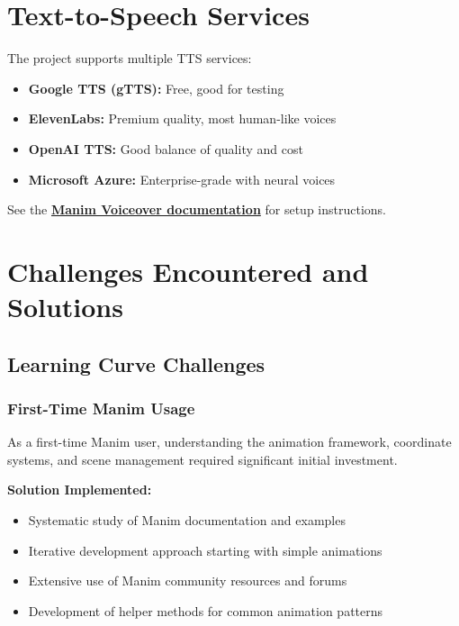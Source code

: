 \documentclass[12pt,a4paper]{article}
\begin{document}
\section{Text-to-Speech Services}

The project supports multiple TTS services:

\begin{itemize}
    \item \textbf{Google TTS (gTTS):} Free, good for testing
    \item \textbf{ElevenLabs:} Premium quality, most human-like voices
    \item \textbf{OpenAI TTS:} Good balance of quality and cost
    \item \textbf{Microsoft Azure:} Enterprise-grade with neural voices
\end{itemize}

See the \href{https://voiceover.manim.community/}{\textbf{Manim Voiceover documentation}} for setup instructions.

\section{Challenges Encountered and Solutions}

\subsection{Learning Curve Challenges}

\subsubsection{First-Time Manim Usage}
\begin{tcolorbox}[colback=red!5!white,colframe=red!75!black,title=Challenge]
As a first-time Manim user, understanding the animation framework, coordinate systems, and scene management required significant initial investment.
\end{tcolorbox}

\textbf{Solution Implemented:}
\begin{itemize}
    \item Systematic study of Manim documentation and examples
    \item Iterative development approach starting with simple animations
    \item Extensive use of Manim community resources and forums
    \item Development of helper methods for common animation patterns
\end{itemize}
\end{document}
